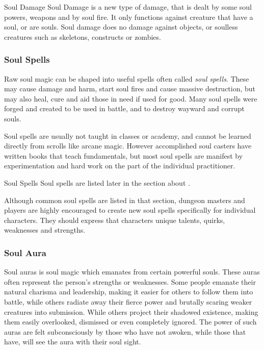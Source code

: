 \begin{35e}{Soul Damage}
  Soul Damage is a new type of damage, that is dealt by some soul powers,
  weapons and by soul fire. It only functions against creature that have a
  soul, or are souls. Soul damage does no damage against objects, or soulless
  creatures such as skeletons, constructs or zombies.
\end{35e}

\subsubsection{Soul Spells}
\label{sec:Soul Spells}

Raw soul magic can be shaped into useful spells often called \emph{soul spells}.
These may cause damage and harm, start soul fires and cause massive destruction,
but may also heal, cure and aid those in need if used for good. Many soul spells
were forged and created to be used in battle, and to destroy wayward and corrupt
souls.

Soul spells are usually not taught in classes or academy, and cannot be learned
directly from scrolls like arcane magic. However accomplished soul casters have
written books that teach fundamentals, but most soul spells are manifest by
experimentation and hard work on the part of the individual practitioner.

\begin{35e}{Soul Spells}
  Soul spells are listed later in the section about .

  Although common soul spells are listed in that section, dungeon masters and
  players are highly encouraged to create new soul spells specifically for
  individual characters. They should express that characters unique talents,
  quirks, weaknesses and strengths.
\end{35e}

\subsubsection{Soul Aura}
\label{sec:Soul Aura}

Soul auras is soul magic which emanates from certain powerful souls. These
auras often represent the person's strengths or weaknesses. Some people
emanate their natural charisma and leadership, making it easier for others to
follow them into battle, while others radiate away their fierce power and
brutally scaring weaker creatures into submission. While others project their
shadowed existence, making them easily overlooked, dismissed or even
completely ignored. The power of such auras are felt subconsciously by those
who have not awoken, while those that have, will see the aura with their soul
sight.

